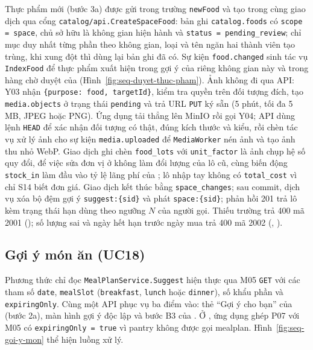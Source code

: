 Thực phẩm mới (bước 3a) được gửi trong trường \texttt{newFood} và tạo trong cùng giao dịch qua cổng \texttt{catalog/api.CreateSpaceFood}: bản ghi \texttt{catalog.foods} có \texttt{scope = space}, chủ sở hữu là không gian hiện hành và \texttt{status = pending\_review}; chỉ mục duy nhất từng phần theo không gian, loại và tên ngăn hai thành viên tạo trùng, khi xung đột thì dùng lại bản ghi đã có. Sự kiện \texttt{food.changed} sinh tác vụ \texttt{IndexFood} để thực phẩm xuất hiện trong gợi ý của riêng không gian này và trong hàng chờ duyệt của  (Hình~\ref{fig:seq-duyet-thuc-pham}). Ảnh không đi qua API: Y03 nhận \texttt{\{purpose: food, targetId\}}, kiểm tra quyền trên đối tượng đích, tạo \texttt{media.objects} ở trạng thái \texttt{pending} và trả URL \texttt{PUT} ký sẵn (5 phút, tối đa 5 MB, JPEG hoặc PNG). Ứng dụng tải thẳng lên MinIO rồi gọi Y04; API dùng lệnh \texttt{HEAD} để xác nhận đối tượng có thật, đúng kích thước và kiểu, rồi chèn tác vụ xử lý ảnh cho sự kiện \texttt{media.uploaded} để \texttt{MediaWorker} nén ảnh và tạo ảnh thu nhỏ WebP. Giao dịch ghi chèn \texttt{food\_lots} với \texttt{unit\_factor} là ảnh chụp hệ số quy đổi, để việc sửa đơn vị ở  không làm đổi lượng của lô cũ, cùng biến động \texttt{stock\_in} làm đầu vào tỷ lệ lãng phí của ; lô nhập tay không có \texttt{total\_cost} vì chỉ S14 biết đơn giá. Giao dịch kết thúc bằng \texttt{space\_changes}; sau commit, dịch vụ xóa bộ đệm gợi ý \texttt{suggest:\{sid\}} và phát \texttt{space:\{sid\}}; phản hồi 201 trả lô kèm trạng thái hạn dùng theo ngưỡng $N$ của người gọi. Thiếu trường trả 400 mã 2001 (); số lượng sai và ngày hết hạn trước ngày mua trả 400 mã 2002 (, ). 

\subsection{Gợi ý món ăn (UC18)}\label{sssec:ht-goi-y-mon}

Phương thức chỉ đọc \texttt{MealPlanService.Suggest} hiện thực  qua M05 \texttt{GET}  với các tham số \texttt{date}, \texttt{mealSlot} (\texttt{breakfast}, \texttt{lunch} hoặc \texttt{dinner}), số khẩu phần và \texttt{expiringOnly}. Cùng một API phục vụ ba điểm vào: thẻ “Gợi ý cho bạn” của  (bước 2a), màn hình gợi ý độc lập và bước B3 của . Ở , ứng dụng ghép P07 với M05 có \texttt{expiringOnly = true} vì pantry không được gọi mealplan. Hình~\ref{fig:seq-goi-y-mon} thể hiện luồng xử lý.

